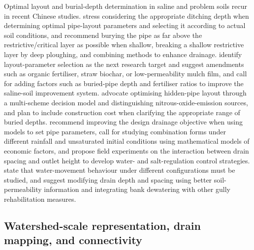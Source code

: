 Optimal layout and burial-depth determination in saline and problem soils
recur in recent Chinese studies. \textcite{Tian2023} stress considering the
appropriate ditching depth when determining optimal pipe-layout parameters and
selecting it according to actual soil conditions, and \textcite{Tian2024}
recommend burying the pipe as far above the restrictive/critical layer as
possible when shallow, breaking a shallow restrictive layer by deep ploughing,
and combining methods to enhance drainage. \textcite{Tian2023c} identify
layout-parameter selection as the next research target and suggest amendments
such as organic fertiliser, straw biochar, or low-permeability mulch film, and
\textcite{Zhang2024d} call for adding factors such as buried-pipe depth and
fertiliser ratios to improve the saline-soil improvement system.
\textcite{Zhai2023} advocate optimising hidden-pipe layout through a
multi-scheme decision model and distinguishing nitrous-oxide-emission sources,
and \textcite{Han2023} plan to include construction cost when clarifying the
appropriate range of buried depths. \textcite{Qian2025b} recommend improving
the design drainage objective when using models to set pipe parameters,
\textcite{Ren2021} call for studying combination forms under different rainfall
and unsaturated initial conditions using mathematical models of economic
factors, and \textcite{Zheng2025} propose field experiments on the interaction
between drain spacing and outlet height to develop water- and salt-regulation
control strategies. \textcite{SerranoCoronel2018} state that water-movement
behaviour under different configurations must be studied, and
\textcite{Zegeye2021} suggest modifying drain depth and spacing using better
soil-permeability information and integrating bank dewatering with other gully
rehabilitation measures.

\subsection{Watershed-scale representation, drain mapping, and connectivity}

